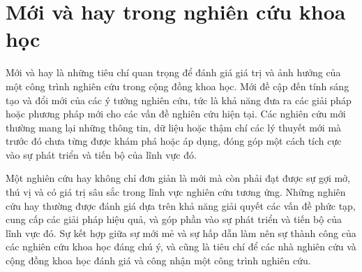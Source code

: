 \section{Mới và hay trong nghiên cứu khoa học}

Mới và hay là những tiêu chí quan trọng để đánh giá giá trị và ảnh hưởng của một công trình nghiên cứu trong cộng đồng khoa học. Mới đề cập đến tính sáng tạo và đổi mới của các ý tưởng nghiên cứu, tức là khả năng đưa ra các giải pháp hoặc phương pháp mới cho các vấn đề nghiên cứu hiện tại. Các nghiên cứu mới thường mang lại những thông tin, dữ liệu hoặc thậm chí các lý thuyết mới mà trước đó chưa từng được khám phá hoặc áp dụng, đóng góp một cách tích cực vào sự phát triển và tiến bộ của lĩnh vực đó.

Một nghiên cứu hay không chỉ đơn giản là mới mà còn phải đạt được sự gợi mở, thú vị và có giá trị sâu sắc trong lĩnh vực nghiên cứu tương ứng. Những nghiên cứu hay thường được đánh giá dựa trên khả năng giải quyết các vấn đề phức tạp, cung cấp các giải pháp hiệu quả, và góp phần vào sự phát triển và tiến bộ của lĩnh vực đó. Sự kết hợp giữa sự mới mẻ và sự hấp dẫn làm nên sự thành công của các nghiên cứu khoa học đáng chú ý, và cũng là tiêu chí để các nhà nghiên cứu và cộng đồng khoa học đánh giá và công nhận một công trình nghiên cứu.